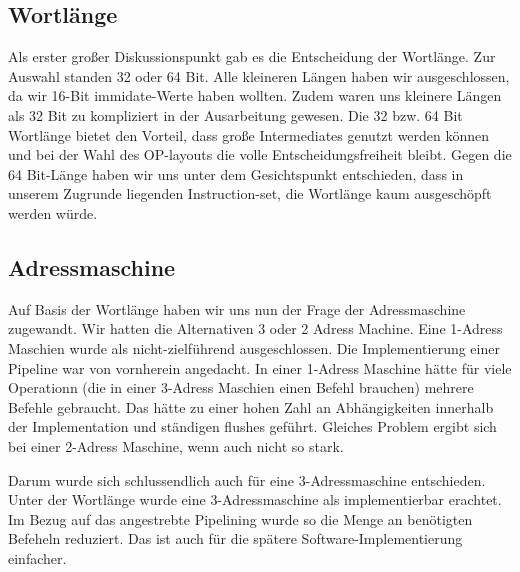 \documentclass[paper=a4,fontsize=12pt,twocolumn]{scrreprt}
\begin{document}
\kant[6]


\subsection{Wortlänge} 

Als erster großer Diskussionspunkt gab es die Entscheidung der Wortlänge.
Zur Auswahl standen 32 oder 64 Bit. Alle kleineren Längen haben wir ausgeschlossen, da wir 16-Bit immidate-Werte haben wollten. Zudem waren uns kleinere Längen als 32 Bit zu kompliziert in der Ausarbeitung gewesen.
Die 32 bzw. 64 Bit Wortlänge bietet den Vorteil, dass große Intermediates genutzt werden können und bei der Wahl des OP-layouts die volle Entscheidungsfreiheit bleibt.
Gegen die 64 Bit-Länge haben wir uns unter dem Gesichtspunkt entschieden, dass in unserem Zugrunde liegenden Instruction-set, die Wortlänge kaum ausgeschöpft werden würde. 


\subsection{Adressmaschine}
Auf Basis der Wortlänge haben wir uns nun der Frage der Adressmaschine zugewandt. Wir hatten die Alternativen 3 oder 2 Adress Machine. Eine 1-Adress Maschien wurde als nicht-zielführend ausgeschlossen. Die Implementierung einer Pipeline war von vornherein angedacht. In einer 1-Adress Maschine hätte für viele Operationn (die in einer 3-Adress Maschien einen Befehl brauchen) mehrere Befehle gebraucht. Das hätte zu einer hohen Zahl an Abhängigkeiten innerhalb der Implementation und ständigen flushes geführt. Gleiches Problem ergibt sich bei einer 2-Adress Maschine, wenn auch nicht so stark. 

Darum wurde sich schlussendlich auch für eine 3-Adressmaschine entschieden. Unter der Wortlänge wurde eine 3-Adressmaschine als implementierbar erachtet. Im Bezug auf das angestrebte Pipelining wurde so die Menge an benötigten Befeheln reduziert. Das ist auch für die spätere Software-Implementierung einfacher. 
\end{document}
